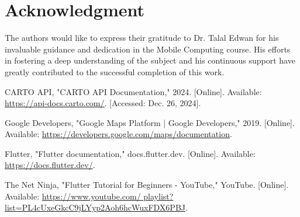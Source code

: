 \documentclass[conference]{IEEEtran}
\begin{document}
\section*{Acknowledgment}

The authors would like to express their gratitude to Dr. Talal Edwan for his invaluable guidance and dedication in the Mobile Computing course. His efforts in fostering a deep understanding of the subject and his continuous support have greatly contributed to the successful completion of this work.


\begin{thebibliography}{00}

 CARTO API, "CARTO API Documentation," 2024. [Online]. Available: \url{https://api-docs.carto.com/}. [Accessed: Dec. 26, 2024].

 Google Developers, "Google Maps Platform | Google Developers," 2019. [Online]. Available: \url{https://developers.google.com/maps/documentation}. 

 Flutter, "Flutter documentation," docs.flutter.dev. [Online]. Available: \url{https://docs.flutter.dev/}.

 The Net Ninja, "Flutter Tutorial for Beginners - YouTube," YouTube. [Online]. Available: \url{https://www.youtube.com/ playlist?list=PL4cUxeGkcC9jLYyp2Aoh6hcWuxFDX6PBJ}.

\end{thebibliography}

\vspace{12pt}
\end{document}
